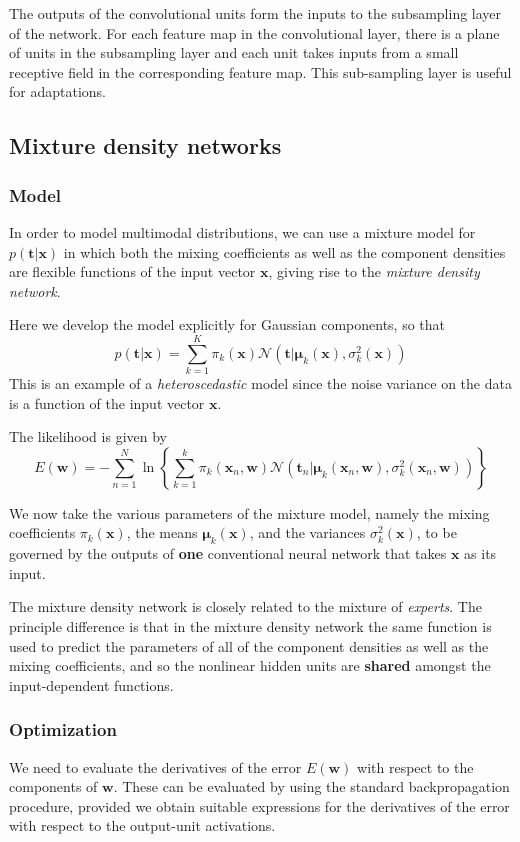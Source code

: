 \documentclass[a4paper]{book}
\renewcommand{\bf}{\mathbf}
\renewcommand{\cal}{\mathcal}
\newcommand{\imp}[1]{\textit{#1}}
\newcommand{\bs}{\boldsymbol}
\begin{document}
The outputs of the convolutional units form the inputs to the subsampling layer of the network. For each feature map in the convolutional layer, there is a plane of units in the subsampling layer and each unit takes inputs from a small receptive field in the corresponding feature map. This sub-sampling layer is useful for adaptations.
\subsection{Mixture density networks}
\subsubsection{Model}
In order to model multimodal distributions, we can use a mixture model for $p(\bf{t|x})$ in which both the mixing coefficients as well as the component densities are flexible functions of the input vector $\bf{x}$, giving rise to the \imp{mixture density network}.

Here we develop the model explicitly for Gaussian components, so that
\begin{equation}
	p(\bf{t|x}) = \sum_{k=1}^K \pi_k(\bf{x}) \cal{N}(\bf{t}|\bs{\mu}_k(\bf{x}),\sigma_k^2(\bf{x}))
\end{equation}
This is an example of a \imp{heteroscedastic} model since the noise variance on the data is a function of the input vector $\bf{x}$.

The likelihood is given by
\begin{equation}
	E(\bf{w})= - \sum_{n=1}^N \ln \left\{ \sum_{k=1}^k \pi_k(\bf{x}_n,\bf{w})\cal{N}(\bf{t}_n|\bs{\mu}_k(\bf{x}_n,\bf{w}),\sigma_k^2(\bf{x}_n,\bf{w})) \right\}
\end{equation}

We now take the various parameters of the mixture model, namely the mixing coefficients $\pi_k(\bf{x})$, the means $\bs{\mu}_k(\bf{x})$, and the variances $\sigma_k^2(\bf{x})$, to be governed by the outputs of \textbf{one} conventional neural network that takes $\bf{x}$ as its input. 

The mixture density network is closely related to the mixture of \imp{experts}. The principle difference is that in the mixture density network the same function is used to predict the parameters of all of the component densities as well as the mixing coefficients, and so the nonlinear hidden units are \textbf{shared} amongst the input-dependent functions.
\subsubsection{Optimization}
We need to evaluate the derivatives of the error $E(\bf{w})$ with respect to the components of $\bf{w}$. These can be evaluated by using the standard backpropagation procedure, provided we obtain suitable expressions for the derivatives of the error with respect to the output-unit activations.
\end{document}
